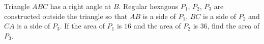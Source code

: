 Triangle $ABC$ has a right angle at $B$. Regular hexagons $P_1$, $P_2$, $P_3$ are constructed outside the triangle so that $AB$ is a side of $P_1$, $BC$ is a side of $P_2$ and $CA$ is a side of $P_3$. If the area of $P_1$ is $16$ and the area of $P_2$ is $36$, find the area of $P_3$.
